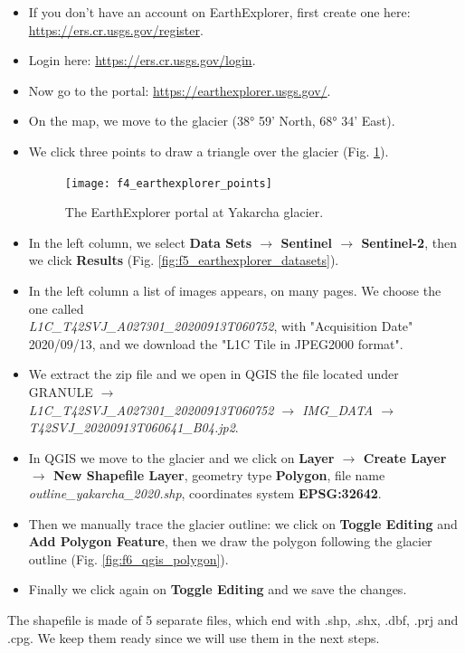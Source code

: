 \documentclass[15pt]{extarticle}
\begin{document}
\begin{itemize}
    \item If you don't have an account on EarthExplorer, first create one here: \href{https://ers.cr.usgs.gov/register}{https://ers.cr.usgs.gov/register}.
    \item Login here: \href{https://ers.cr.usgs.gov/login}{https://ers.cr.usgs.gov/login}.
    \item Now go to the portal: \href{https://earthexplorer.usgs.gov/}{https://earthexplorer.usgs.gov/}.
    \item On the map, we move to the glacier (38° 59' North, 68° 34' East).
    \item We click three points to draw a triangle over the glacier (Fig. \ref{fig:f4_earthexplorer_points}).
    
    \begin{figure}[h!]
    \centering
    \texttt{[image: f4\_earthexplorer\_points]}
    \caption{The EarthExplorer portal at Yakarcha glacier.}
    \label{fig:f4_earthexplorer_points}
    \end{figure}
    
    \item In the left column, we select \textbf{Data Sets $\rightarrow$ Sentinel $\rightarrow$ Sentinel-2}, then we click \textbf{Results} (Fig. \ref{fig:f5_earthexplorer_datasets}).
    \item In the left column a list of images appears, on many pages. We choose the one called\\ \textit{L1C\_T42SVJ\_A027301\_20200913T060752}, with "Acquisition Date" 2020/09/13, and we download the "L1C Tile in JPEG2000 format".
    \item We extract the zip file and we open in QGIS the file located under GRANULE \textit{$\rightarrow$ \\ L1C\_T42SVJ\_A027301\_20200913T060752 $\rightarrow$ IMG\_DATA $\rightarrow$ T42SVJ\_20200913T060641\_B04.jp2}.
    \item In QGIS we move to the glacier and we click on \textbf{Layer $\rightarrow$ Create Layer $\rightarrow$ New Shapefile Layer}, geometry type \textbf{Polygon}, file name \textit{outline\_yakarcha\_2020.shp}, coordinates system \textbf{EPSG:32642}.
    \item Then we manually trace the glacier outline: we click on \textbf{Toggle Editing} and \textbf{Add Polygon Feature}, then we draw the polygon following the glacier outline (Fig. \ref{fig:f6_qgis_polygon}).
    \item Finally we click again on \textbf{Toggle Editing} and we save the changes.
\end{itemize}
The shapefile is made of 5 separate files, which end with .shp, .shx, .dbf, .prj and .cpg. We keep them ready since we will use them in the next steps.
\end{document}
